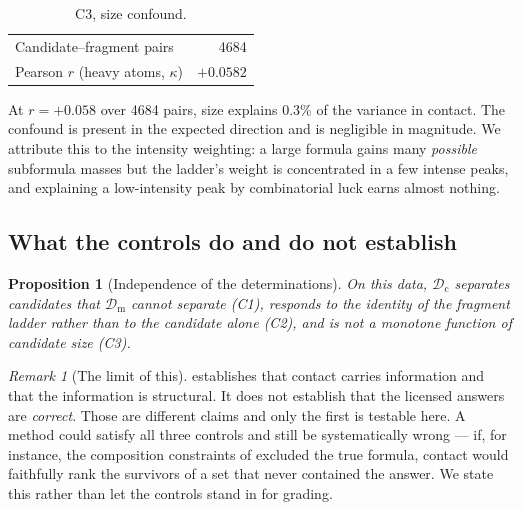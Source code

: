 \documentclass[11pt,twocolumn,a4paper]{article}
\newtheorem{proposition}[theorem]{Proposition}
\theoremstyle{definition}
\theoremstyle{remark}
\newtheorem{remark}[theorem]{Remark}
\newcommand{\Dmass}{\mathcal{D}_{\mathrm{m}}}
\newcommand{\Dcon}{\mathcal{D}_{\mathrm{c}}}
\newcommand{\con}{\kappa}
\begin{document}
\begin{table}[!htbp]
\centering
\caption{C3, size confound.}
\label{tab:c3}
\begin{tabular}{lr}
\toprule
Candidate--fragment pairs         & 4684 \\
Pearson $r$ (heavy atoms, $\con$) & $+0.0582$ \\
\bottomrule
\end{tabular}
\end{table}

At $r = +0.058$ over 4684 pairs, size explains 0.3\% of the variance in contact.
The confound is present in the expected direction and is negligible in magnitude.
We attribute this to the intensity weighting: a large formula gains many
\emph{possible} subformula masses but the ladder's weight is concentrated in a few
intense peaks, and explaining a low-intensity peak by combinatorial luck earns
almost nothing.

\subsection{What the controls do and do not establish}

\begin{proposition}[Independence of the determinations]
\label{prop:independence}
On this data, $\Dcon$ separates candidates that $\Dmass$ cannot separate (C1),
responds to the identity of the fragment ladder rather than to the candidate
alone (C2), and is not a monotone function of candidate size (C3).
\end{proposition}

\begin{remark}[The limit of this]
 establishes that contact carries information and that
the information is structural. It does not establish that the licensed answers
are \emph{correct}. Those are different claims and only the first is testable
here. A method could satisfy all three controls and still be systematically wrong
--- if, for instance, the composition constraints of 
excluded the true formula, contact would faithfully rank the survivors of a set
that never contained the answer. We state this rather than let the controls stand
in for grading.
\end{remark}
\end{document}
